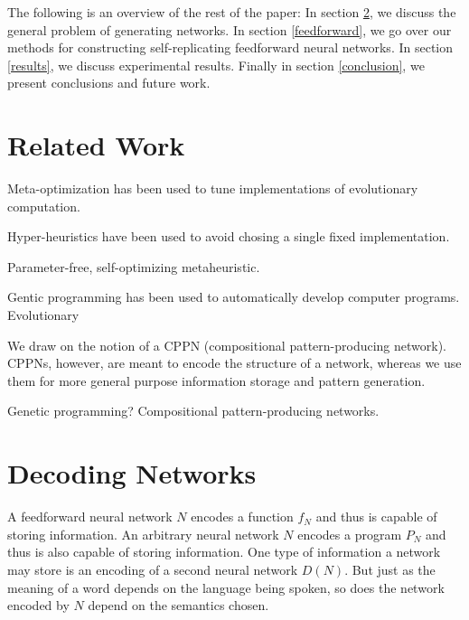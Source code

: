 \documentclass[12pt]{article}
\begin{document}
%
%


The following is an overview of the rest of the paper:
In section \ref{problemstatement},
we discuss the general problem of generating networks.
In section \ref{feedforward},
we go over our methods
for constructing self-replicating feedforward neural networks.
In section \ref{results},
we discuss experimental results.
Finally in section \ref{conclusion},
we present conclusions and future work.

\section{Related Work}
\label{related}

Meta-optimization
has been used to tune implementations
of evolutionary computation.%
\cite{brest2006param}

Hyper-heuristics
have been used to avoid chosing a single fixed implementation.

Parameter-free, self-optimizing metaheuristic.

Gentic programming has been used
to automatically develop computer programs.
Evolutionary 

We draw on the notion of a CPPN (compositional
pattern-producing network).\cite{stanley2007cppn}
CPPNs, however, are meant to encode the structure
of a network, whereas we use them
for more general purpose information storage
and pattern generation.

Genetic programming?
Compositional pattern-producing networks.

\section{Decoding Networks}
\label{problemstatement}

A feedforward neural network $N$ encodes a function $f_N$
and thus is capable of storing information.
An arbitrary neural network $N$ encodes a program $P_N$
and thus is also capable of storing information.
One type of information a network may store
is an encoding of a second neural network $D(N)$.
But just as the meaning of a word
depends on the language being spoken,
so does the network encoded by $N$
depend on the semantics chosen.
\end{document}
